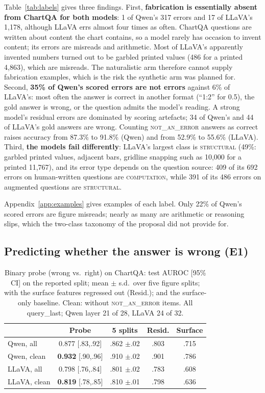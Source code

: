 \documentclass[11pt]{article}
\newcommand{\cls}[1]{\textsc{#1}}
\begin{document}
Table~\ref{tab:labels} gives three findings. First, \textbf{fabrication is
essentially absent from ChartQA for both models}: 1 of Qwen's 317 errors and 17
of LLaVA's 1,178, although LLaVA errs almost four times as often. ChartQA
questions are written about content the chart contains, so a model rarely has
occasion to invent content; its errors are misreads and arithmetic. Most of
LLaVA's apparently invented numbers turned out to be garbled printed values
(486 for a printed 4,863), which are misreads. The naturalistic arm therefore
cannot supply fabrication examples, which is the risk the synthetic arm was
planned for. Second, \textbf{35\% of Qwen's scored errors are not errors}
against 6\% of LLaVA's: most often the answer is correct in another format
(``1:2'' for 0.5), the gold answer is wrong, or the question admits the model's
reading. A strong model's residual errors are dominated by scoring artefacts;
34 of Qwen's and 44 of LLaVA's gold answers are wrong. Counting
\cls{not\_an\_error} answers as correct raises accuracy from 87.3\% to 91.8\%
(Qwen) and from 52.9\% to 55.6\% (LLaVA). Third, \textbf{the models fail
differently}: LLaVA's largest class is \cls{structural} (49\%: garbled printed
values, adjacent bars, gridline snapping such as 10,000 for a printed 11,767),
and its error type depends on the question source: 409 of its 692 errors on
human-written questions are \cls{computation}, while 391 of its 486 errors on
augmented questions are \cls{structural}.

Appendix~\ref{app:examples} gives examples of each label. Only 22\% of Qwen's scored errors are figure misreads; nearly as many are
arithmetic or reasoning slips, which the two-class taxonomy of the proposal did
not provide for.

\subsection{Predicting whether the answer is wrong (E1)}
\label{sec:e1}

\begin{table}[t]
\centering\small
\setlength{\tabcolsep}{3pt}
\begin{tabular}{lcccc}
\toprule
 & Probe & 5 splits & Resid. & Surface \\
\midrule
Qwen, all & 0.877 {\scriptsize[.83,.92]} & .862 {\scriptsize$\pm$.02} & .803 & .715 \\
Qwen, clean & \textbf{0.932} {\scriptsize[.90,.96]} & .910 {\scriptsize$\pm$.02} & .901 & .786 \\
LLaVA, all & 0.798 {\scriptsize[.76,.84]} & .801 {\scriptsize$\pm$.02} & .783 & .608 \\
LLaVA, clean & \textbf{0.819} {\scriptsize[.78,.85]} & .810 {\scriptsize$\pm$.01} & .798 & .636 \\
\bottomrule
\end{tabular}
\caption{Binary probe (wrong vs.\ right) on ChartQA: test AUROC [95\% CI] on the
reported split; mean $\pm$ s.d.\ over five figure splits; with the surface
features regressed out (Resid.); and the surface-only baseline. Clean: without
\cls{not\_an\_error} items. All query\_last; Qwen layer 21 of 28, LLaVA 24 of 32.}
\label{tab:e1}
\end{table}
\end{document}
